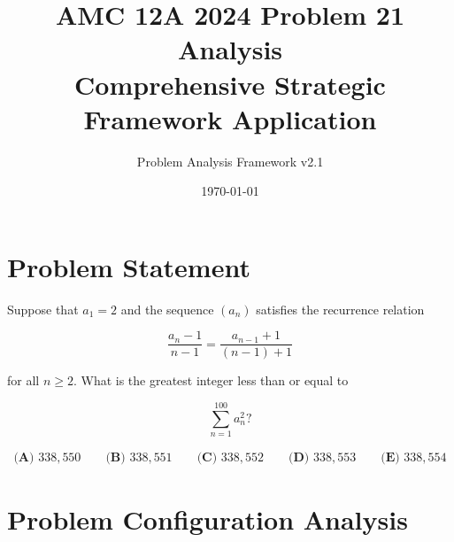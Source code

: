 \documentclass[12pt]{article}
\title{\textbf{AMC 12A 2024 Problem 21 Analysis}\\
\large{Comprehensive Strategic Framework Application}}
\author{Problem Analysis Framework v2.1}
\date{\today}
\begin{document}
\maketitle

\section*{Problem Statement}

Suppose that $a_1 = 2$ and the sequence $(a_n)$ satisfies the recurrence relation

\[\frac{a_n -1}{n-1}=\frac{a_{n-1}+1}{(n-1)+1}\]

for all $n \geq 2$. What is the greatest integer less than or equal to

\[\sum^{100}_{n=1} a_n^2?\]

\begin{align*}
\textbf{(A) } 338{,}550 \qquad \textbf{(B) } 338{,}551 \qquad \textbf{(C) } 338{,}552 \qquad \textbf{(D) } 338{,}553 \qquad \textbf{(E) } 338{,}554
\end{align*}

\section{Problem Configuration Analysis}
\end{document}
